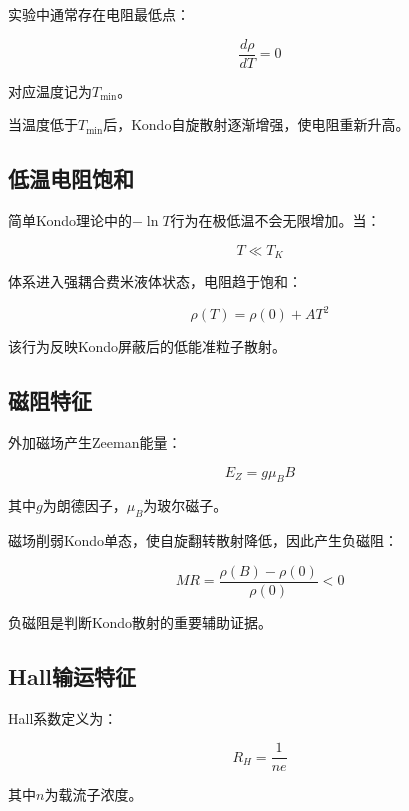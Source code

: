 \documentclass[10.5pt]{article}
\begin{document}
实验中通常存在电阻最低点：

\begin{equation}
\frac{d\rho}{dT}=0
\end{equation}

对应温度记为$T_{\min}$。

当温度低于$T_{\min}$后，Kondo自旋散射逐渐增强，使电阻重新升高。


\subsection{低温电阻饱和}

简单Kondo理论中的$-\ln T$行为在极低温不会无限增加。当：

\begin{equation}
T\ll T_K
\end{equation}

体系进入强耦合费米液体状态，电阻趋于饱和：

\begin{equation}
\rho(T)=\rho(0)+AT^2
\end{equation}

该行为反映Kondo屏蔽后的低能准粒子散射。


\subsection{磁阻特征}

外加磁场产生Zeeman能量：

\begin{equation}
E_Z=g\mu_BB
\end{equation}

其中$g$为朗德因子，$\mu_B$为玻尔磁子。

磁场削弱Kondo单态，使自旋翻转散射降低，因此产生负磁阻：

\begin{equation}
MR=
\frac{\rho(B)-\rho(0)}
{\rho(0)}
<0
\end{equation}

负磁阻是判断Kondo散射的重要辅助证据。


\subsection{Hall输运特征}

Hall系数定义为：

\begin{equation}
R_H=\frac{1}{ne}
\end{equation}

其中$n$为载流子浓度。
\end{document}
